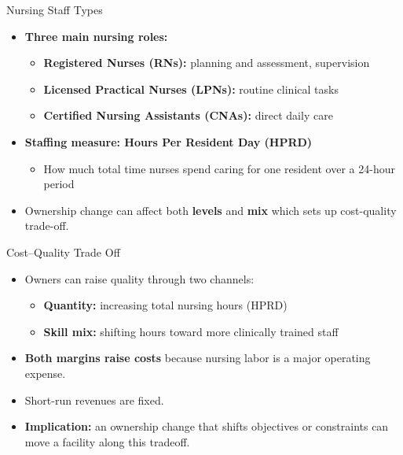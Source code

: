 \documentclass{beamer}
\begin{document}
\begin{frame}[t]{Nursing Staff Types}

\begin{itemize}
	\setlength{\itemsep}{0.7em}

	\item \textbf{Three main nursing roles:}
	\begin{itemize}
		
		\vspace{0.2em}
		\setlength{\itemsep}{0.5em}
		\item \textbf{Registered Nurses (RNs):} planning and assessment, supervision
		\item \textbf{Licensed Practical Nurses (LPNs):} routine clinical tasks
		\item \textbf{Certified Nursing Assistants (CNAs):} direct daily care
		
	\end{itemize}
	
	\pause

	\vspace{0.25em}
	\item \textbf{Staffing measure: Hours Per Resident Day (HPRD)}
	\begin{itemize}
		\setlength{\itemsep}{0.2em}
		\item How much total time nurses spend caring for one resident over a 24-hour period
	\end{itemize}

	\vspace{0.25em}
	\item Ownership change can affect both \textbf{levels} and \textbf{mix} which sets up cost-quality trade-off.
\end{itemize}
\end{frame}

\begin{frame}[t]{Cost--Quality Trade Off}

\begin{itemize}
	\setlength{\itemsep}{0.8em}
	\item Owners can raise quality through two channels:
	\begin{itemize}
		\setlength{\itemsep}{0.25em}
		\item \textbf{Quantity:} increasing total nursing hours (HPRD)
		\item \textbf{Skill mix:} shifting hours toward more clinically trained staff
	\end{itemize}
	
	\item \textbf{Both margins raise costs} because nursing labor is a major operating expense.
	\item Short-run revenues are fixed.
	\item \textbf{Implication:} an ownership change that shifts objectives or constraints can move a facility 	along this tradeoff.

\end{itemize}
\end{frame}
\end{document}
